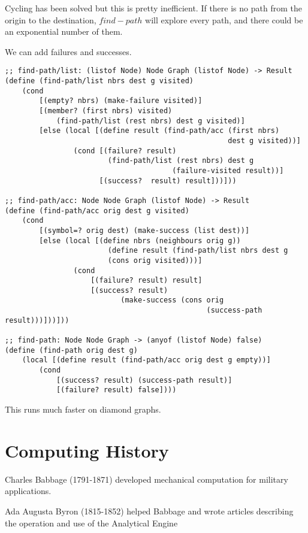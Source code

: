 \documentclass{article}
\begin{document}
Cycling has been solved but this is pretty inefficient. If there is no path from the origin to the destination, $find-path$ will explore every path, and there could be an exponential number of them. 

We can add failures and successes. 

\begin{lstlisting}
;; find-path/list: (listof Node) Node Graph (listof Node) -> Result
(define (find-path/list nbrs dest g visited)
    (cond 
        [(empty? nbrs) (make-failure visited)]
        [(member? (first nbrs) visited)
            (find-path/list (rest nbrs) dest g visited)]
        [else (local [(define result (find-path/acc (first nbrs)
                                                    dest g visited))]
                (cond [(failure? result)
                        (find-path/list (rest nbrs) dest g
                                       (failure-visited result))]
                      [(success?  result) result]))]))

;; find-path/acc: Node Node Graph (listof Node) -> Result
(define (find-path/acc orig dest g visited)
    (cond 
        [(symbol=? orig dest) (make-success (list dest))] 
        [else (local [(define nbrs (neighbours orig g))
                        (define result (find-path/list nbrs dest g
                        (cons orig visited)))]
                (cond 
                    [(failure? result) result] 
                    [(success? result)
                           (make-success (cons orig
                                               (success-path result)))]))]))

;; find-path: Node Node Graph -> (anyof (listof Node) false)
(define (find-path orig dest g)
    (local [(define result (find-path/acc orig dest g empty))]
        (cond 
            [(success? result) (success-path result)]
            [(failure? result) false])))
\end{lstlisting}

This runs much faster on diamond graphs. 

\section{Computing History}

Charles Babbage (1791-1871) developed mechanical computation for military applications. 

Ada Augusta Byron (1815-1852) helped Babbage and wrote articles describing the operation and use of the Analytical Engine
\end{document}
